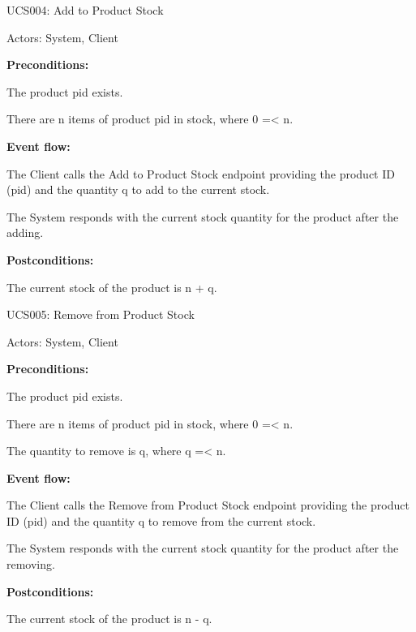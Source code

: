 \begin{ucbox}{UCS004: Add to Product Stock}
\label{UCS004}

Actors: System, Client

\textbf{Preconditions:}

\ucitem The product pid exists.

\ucitem There are n items of product pid in stock, where 0 =< n. 

\textbf{Event flow:}

\ucitem The Client calls the Add to Product Stock endpoint providing the product ID (pid) and the quantity q to add to the current stock.

\ucitem The System responds with the current stock quantity for the product after the adding.

\textbf{Postconditions:}

\ucitem The current stock of the product is n + q.

\end{ucbox}

\begin{ucbox}{UCS005: Remove from Product Stock}
\label{UCS005}

Actors: System, Client

\textbf{Preconditions:}

\ucitem The product pid exists.

\ucitem There are n items of product pid in stock, where 0 =< n.

\ucitem The quantity to remove is q, where q =< n.

\textbf{Event flow:}

\ucitem The Client calls the Remove from Product Stock endpoint providing the product ID (pid) and the quantity q to remove from the current stock.

\ucitem The System responds with the current stock quantity for the product after the removing.

\textbf{Postconditions:}

\ucitem The current stock of the product is n - q.

\end{ucbox}
\newpage